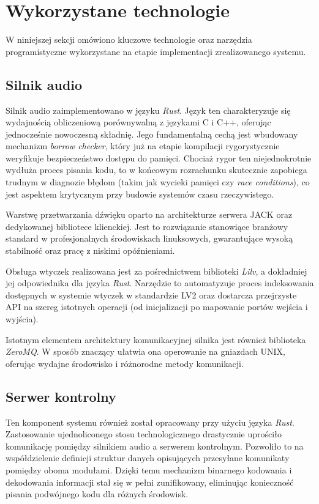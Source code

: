 \documentclass[12pt,a4paper]{report}
\begin{document}
\section{Wykorzystane technologie}
W niniejszej sekcji omówiono kluczowe technologie oraz narzędzia
programistyczne wykorzystane na etapie implementacji zrealizowanego systemu.

\subsection{Silnik audio}
Silnik audio zaimplementowano w języku \textit{Rust}. Język ten
charakteryzuje się wydajnością obliczeniową porównywalną z językami C
i C++, oferując jednocześnie nowoczesną składnię. Jego fundamentalną
cechą jest wbudowany mechanizm \textit{borrow
checker}\cite{rust_docs}, który już na etapie kompilacji
rygorystycznie weryfikuje bezpieczeństwo dostępu do pamięci. Chociaż
rygor ten niejednokrotnie wydłuża proces pisania kodu, to w końcowym
rozrachunku skutecznie zapobiega trudnym w diagnozie błędom (takim
jak wycieki pamięci czy \textit{race conditions}), co jest aspektem
krytycznym przy budowie systemów czasu rzeczywistego.

Warstwę przetwarzania dźwięku oparto na architekturze serwera JACK
oraz dedykowanej bibliotece klienckiej. Jest to rozwiązanie
stanowiące branżowy standard w profesjonalnych środowiskach
linuksowych, gwarantujące wysoką stabilność oraz pracę z niskimi opóźnieniami.

Obsługa wtyczek realizowana jest za pośrednictwem biblioteki
\textit{Lilv}, a dokładniej jej odpowiednika dla języka
\textit{Rust}. Narzędzie to automatyzuje proces indeksowania
dostępnych w systemie wtyczek w standardzie LV2 oraz dostarcza
przejrzyste API na szereg istotnych operacji (od inicjalizacji po
mapowanie portów wejścia i wyjścia).

Istotnym elementem architektury komunikacyjnej silnika jest również
biblioteka \textit{ZeroMQ}. W sposób znaczący ułatwia ona operowanie
na gniazdach UNIX, oferując wydajne środowisko i różnorodne metody komunikacji.

\subsection{Serwer kontrolny}
Ten komponent systemu również został opracowany przy użyciu języka
\textit{Rust}. Zastosowanie ujednoliconego stosu technologicznego
drastycznie uprościło komunikację pomiędzy silnikiem audio a serwerem
kontrolnym. Pozwoliło to na współdzielenie definicji struktur danych
opisujących przesyłane komunikaty pomiędzy oboma modułami. Dzięki
temu mechanizm binarnego kodowania i dekodowania informacji stał się
w pełni zunifikowany, eliminując konieczność pisania podwójnego kodu
dla różnych środowisk.
\end{document}
